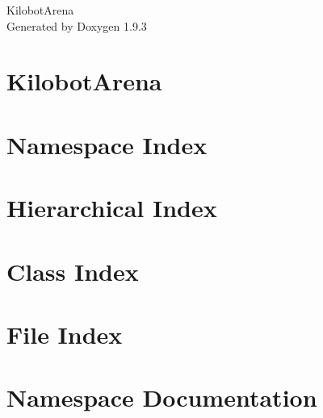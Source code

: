 \documentclass[twoside]{book}
\newcommand{\+}{\discretionary{\mbox{\scriptsize$\hookleftarrow$}}{}{}}
\newcommand{\clearemptydoublepage}{%
    \newpage{\pagestyle{empty}\cleardoublepage}%
  }
\begin{document}
  \raggedbottom
    \hypersetup{pageanchor=false,
                bookmarksnumbered=true,
                pdfencoding=unicode
               }
  \begin{titlepage}
  \vspace*{7cm}
  \begin{center}%
  {\Large Kilobot\+Arena}\\
  \vspace*{1cm}
  {\large Generated by Doxygen 1.9.3}\\
  \end{center}
  \end{titlepage}
  \clearemptydoublepage
  \tableofcontents
  \clearemptydoublepage
  \hypersetup{pageanchor=true}
\chapter{Kilobot\+Arena}
\label{md___users_peterjanku__sources_cpp__kilobot_arena__r_e_a_d_m_e}

\chapter{Namespace Index}

\chapter{Hierarchical Index}

\chapter{Class Index}

\chapter{File Index}

\chapter{Namespace Documentation}


\end{document}
